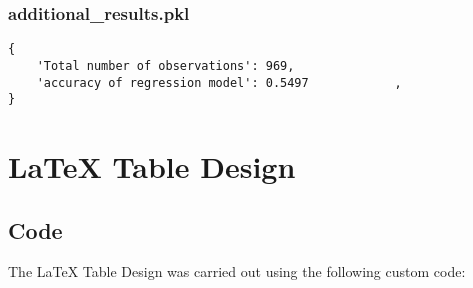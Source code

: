 \documentclass[11pt]{article}
\begin{document}
\subsubsection*{additional\_results.pkl}

\begin{Verbatim}[tabsize=4]
{
    'Total number of observations': 969,
    'accuracy of regression model': 0.5497            ,
}
\end{Verbatim}

\section{LaTeX Table Design}
\subsection{{Code}}
The LaTeX Table Design was carried out using the following custom code:
\end{document}
